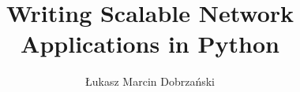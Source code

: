 \documentclass[msc,oneside,11pt,norunningheaders]{ubcthesiscpbl}
\title{Writing Scalable Network Applications in Python}
\subtitle{}
\author{Łukasz Marcin Dobrzański}
\newcommand{\ifdoDoubleSpace}[1]{}
\def\setpageforTOC{\setcounter{page}{2}}
\def\setpageforTOC{}
\def\dedication#1{
  \chapter[Dedication]{} %
  \thispagestyle{plain}   %
  \vspace{6cm}
  \begin{center}
    #1
  \end{center}
  }
\begin{document}

\ifdoDoubleSpace{ \begin{singlespace} }

\frontmatter

\maketitle
\newpage\thispagestyle{empty}\newpage  %


\newpage\thispagestyle{empty}\newpage  %
\setpageforTOC

\tableofcontents
\listoffigures



		
\newpage				%
\thispagestyle{plain}		%
\mainmatter			%

\ifdoDoubleSpace{ \end{singlespace} }

     
\begin{spacing}{1.0}
	
	
\end{spacing}

	
\end{document}
